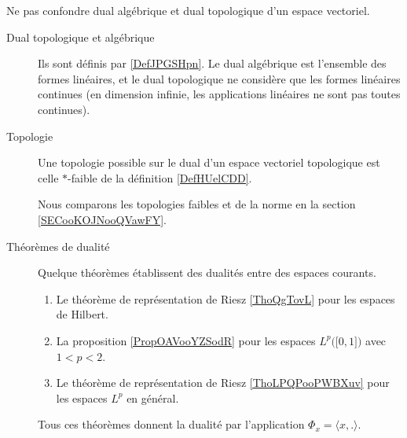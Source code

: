 
     \label{THEMEooULGFooPscFJC}

Ne pas confondre dual algébrique et dual topologique d'un espace vectoriel.

\begin{description}
    \item[Dual topologique et algébrique]
        Ils sont définis par \ref{DefJPGSHpn}. Le dual algébrique est l'ensemble des formes linéaires, et le dual topologique ne considère que les formes linéaires continues (en dimension infinie, les applications linéaires ne sont pas toutes continues).
    \item[Topologie]
        Une topologie possible sur le dual d'un espace vectoriel topologique est celle \( *\)-faible de la définition \ref{DefHUelCDD}.

        Nous comparons les topologies faibles et de la norme en la section \ref{SECooKOJNooQVawFY}.
    \item[Théorèmes de dualité]
        Quelque théorèmes établissent des dualités entre des espaces courants.
\begin{enumerate}
    \item
        Le théorème de représentation de Riesz \ref{ThoQgTovL} pour les espaces de Hilbert.
    \item
        La proposition \ref{PropOAVooYZSodR} pour les espaces \( L^p\big( \mathopen[ 0 , 1 \mathclose] \big)\) avec \( 1<p<2\).
    \item
        Le théorème de représentation de Riesz \ref{ThoLPQPooPWBXuv} pour les espaces \( L^p\) en général.
\end{enumerate}
Tous ces théorèmes donnent la dualité par l'application \( \Phi_x=\langle x, .\rangle \).

\end{description}
